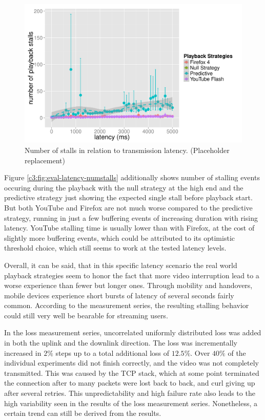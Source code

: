 \begin{figure}[htb]
    \centering
    \includegraphics[width=\textwidth]{images/R-playbackemulation-stallnumber-latency.pdf}
    \caption{Number of stalls in relation to transmission latency. (Placeholder replacement)}
    \label{c3:fig:eval-latency-numstalls-R}
\end{figure}

Figure \ref{c3:fig:eval-latency-numstalls} additionally shows number of stalling events occuring during the playback with the null strategy at the high end and the predictive strategy just showing the expected single stall before playback start. But both YouTube and Firefox are not much worse compared to the predictive strategy, running in just a few buffering events of increasing duration with rising latency. YouTube stalling time is usually lower than with Firefox, at the cost of slightly more buffering events, which could be attributed to its optimistic threshold choice, which still seems to work at the tested latency levels.

Overall, it can be said, that in this specific latency scenario the real world playback strategies seem to honor the fact that more video interruption lead to a worse experience than fewer but longer ones.  Through mobility and handovers, mobile devices experience short bursts of latency of several seconds fairly common. According to the measurement series, the resulting stalling behavior could still very well be bearable for streaming users.

In the loss measurement series, uncorrelated uniformly distributed loss was added in both the uplink and the downlink direction. The loss was incrementally increased in $2\%$ steps up to a total additional loss of $12.5\%$. Over $40\%$ of the individual experiments did not finish correctly, and the video was not completely transmitted. This was caused by the \gls{TCP} stack, which at some point terminated the connection after to many packets were lost back to back, and curl giving up after several retries. This unpredictability and high failure rate also leads to the high variability seen in the results of the loss measurement series. Nonetheless, a certain trend can still be derived from the results.

